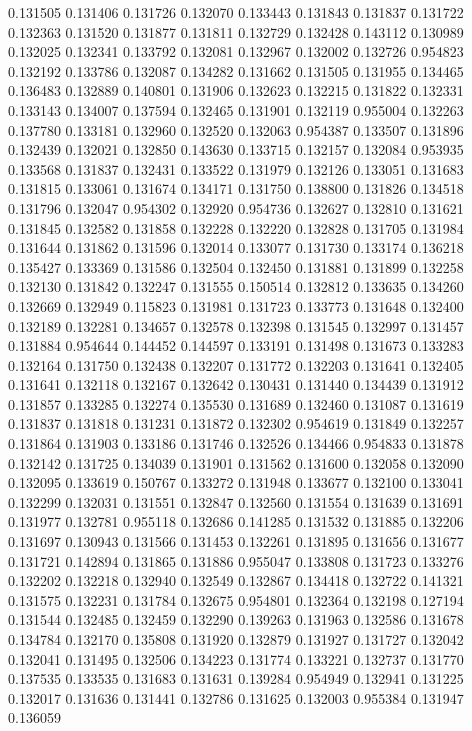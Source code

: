 0.131505
0.131406
0.131726
0.132070
0.133443
0.131843
0.131837
0.131722
0.132363
0.131520
0.131877
0.131811
0.132729
0.132428
0.143112
0.130989
0.132025
0.132341
0.133792
0.132081
0.132967
0.132002
0.132726
0.954823
0.132192
0.133786
0.132087
0.134282
0.131662
0.131505
0.131955
0.134465
0.136483
0.132889
0.140801
0.131906
0.132623
0.132215
0.131822
0.132331
0.133143
0.134007
0.137594
0.132465
0.131901
0.132119
0.955004
0.132263
0.137780
0.133181
0.132960
0.132520
0.132063
0.954387
0.133507
0.131896
0.132439
0.132021
0.132850
0.143630
0.133715
0.132157
0.132084
0.953935
0.133568
0.131837
0.132431
0.133522
0.131979
0.132126
0.133051
0.131683
0.131815
0.133061
0.131674
0.134171
0.131750
0.138800
0.131826
0.134518
0.131796
0.132047
0.954302
0.132920
0.954736
0.132627
0.132810
0.131621
0.131845
0.132582
0.131858
0.132228
0.132220
0.132828
0.131705
0.131984
0.131644
0.131862
0.131596
0.132014
0.133077
0.131730
0.133174
0.136218
0.135427
0.133369
0.131586
0.132504
0.132450
0.131881
0.131899
0.132258
0.132130
0.131842
0.132247
0.131555
0.150514
0.132812
0.133635
0.134260
0.132669
0.132949
0.115823
0.131981
0.131723
0.133773
0.131648
0.132400
0.132189
0.132281
0.134657
0.132578
0.132398
0.131545
0.132997
0.131457
0.131884
0.954644
0.144452
0.144597
0.133191
0.131498
0.131673
0.133283
0.132164
0.131750
0.132438
0.132207
0.131772
0.132203
0.131641
0.132405
0.131641
0.132118
0.132167
0.132642
0.130431
0.131440
0.134439
0.131912
0.131857
0.133285
0.132274
0.135530
0.131689
0.132460
0.131087
0.131619
0.131837
0.131818
0.131231
0.131872
0.132302
0.954619
0.131849
0.132257
0.131864
0.131903
0.133186
0.131746
0.132526
0.134466
0.954833
0.131878
0.132142
0.131725
0.134039
0.131901
0.131562
0.131600
0.132058
0.132090
0.132095
0.133619
0.150767
0.133272
0.131948
0.133677
0.132100
0.133041
0.132299
0.132031
0.131551
0.132847
0.132560
0.131554
0.131639
0.131691
0.131977
0.132781
0.955118
0.132686
0.141285
0.131532
0.131885
0.132206
0.131697
0.130943
0.131566
0.131453
0.132261
0.131895
0.131656
0.131677
0.131721
0.142894
0.131865
0.131886
0.955047
0.133808
0.131723
0.133276
0.132202
0.132218
0.132940
0.132549
0.132867
0.134418
0.132722
0.141321
0.131575
0.132231
0.131784
0.132675
0.954801
0.132364
0.132198
0.127194
0.131544
0.132485
0.132459
0.132290
0.139263
0.131963
0.132586
0.131678
0.134784
0.132170
0.135808
0.131920
0.132879
0.131927
0.131727
0.132042
0.132041
0.131495
0.132506
0.134223
0.131774
0.133221
0.132737
0.131770
0.137535
0.133535
0.131683
0.131631
0.139284
0.954949
0.132941
0.131225
0.132017
0.131636
0.131441
0.132786
0.131625
0.132003
0.955384
0.131947
0.136059
